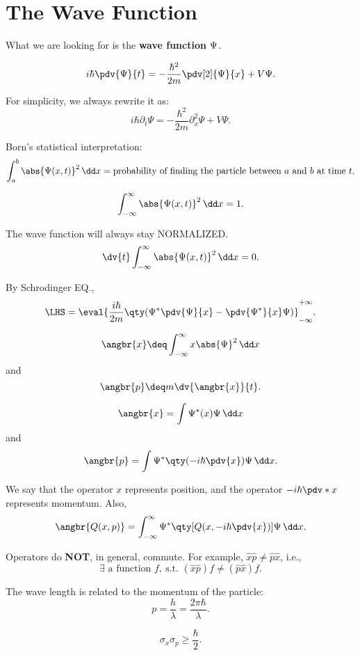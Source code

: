 \section{The Wave Function}

What we are looking for is the \textbf{wave function} $\*\Psi$.
\begin{law}
	\[
		i\hbar\pdv{\Psi}{t}=-\frac{\hbar^2}{2m}\pdv[2]{\Psi}{x}+V\Psi
	.\]
\end{law}

For simplicity, we always rewrite it as:
\[
    i\hbar\partial_t\Psi=-\frac{\hbar^2}{2m}\partial_x^2\Psi+V\Psi
.\]

Born's statistical interpretation:
\[
	\int_{a}^{b} \abs{\Psi(x,t)}^2 \,\dd x=\text{probability of finding the particle between $a$ and $b$ at time $t$}
	.\]

\begin{law}[Normalization]
	\[
		\int_{-\infty}^{\infty} \abs{\Psi(x,t)}^2 \,\dd x = 1
		.\]
\end{law}

\begin{prp}
	The wave function will always stay NORMALIZED.
	\[
		\dv{t}\int_{-\infty}^{\infty} \abs{\Psi(x,t)}^2 \,\dd x = 0
		.\]
\end{prp}

\begin{prf}By Schrodinger EQ.,
	\[
		\LHS=\eval{\frac{i\hbar}{2m}\qty(\Psi^*\pdv{\Psi}{x}-\pdv{\Psi^*}{x}\Psi)}_{-\infty}^{+\infty}
		.\]
\end{prf}

\begin{defi}
	\[
		\angbr{x} \deq \int_{-\infty}^{\infty} x\abs{\Psi}^2 \,\dd x
	\]
	and
	\[
		\angbr{p} \deq m\dv{\angbr{x}}{t}
		.\]
\end{defi}

\begin{thm}
	\[
		\angbr{x}=\int \Psi^*(x)\Psi \,\dd x
	\]
	and
	\[
		\angbr{p}=\int \Psi^*\qty(-i\hbar\pdv{x})\Psi \,\dd x
		.\]
\end{thm}

\begin{remark}[Operator]
	We say that the operator $x$ represents position, and the operator $-i\hbar\pdv*{x}$ represents momentum. Also,
	\[
		\angbr{Q(x,p)}=\int_{-\infty}^{\infty} \Psi^*\qty[Q(x,-i\hbar\pdv{x})]\Psi \,\dd x
	.\] 
\end{remark}
\begin{prt}
	Operators do \textbf{NOT}, in general, commute. For example, $\hat{x}\hat{p}\ne \hat{p}\hat{x}$, i.e., 
	\[
		\exists\mbox{ a function }f,\ \mbox{s.t. }(\hat{x}\hat{p})f\ne (\hat{p}\hat{x})f
.\]
\end{prt}

\begin{thm}
	The wave length is related to the momentum of the particle:
	\[
		p=\frac{h}{\lambda}=\frac{2\pi\hbar}{\lambda}
	.\] 
\end{thm}

\begin{thm}
	\[
	    \sigma_x\sigma_p\ge \frac{\hbar}{2}
	.\] 
\end{thm}


